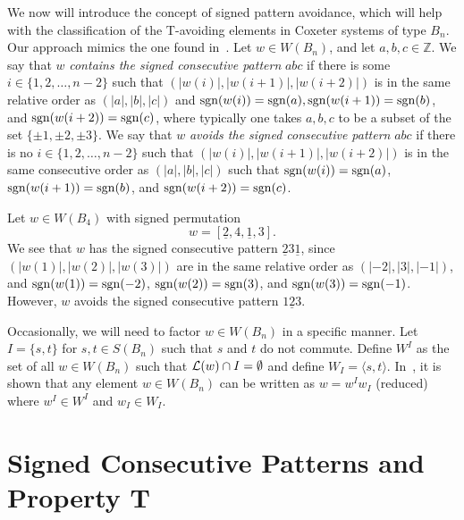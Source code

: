 We now will introduce the concept of signed pattern avoidance, which will help with the classification of the T-avoiding elements in Coxeter systems of type $B_n$. Our approach mimics the one found in~\cite{Gern2013a}. Let $w \in W(B_n)$, and let $a,b,c \in \mathbb{Z}$. We say that $w$ \emph{contains the signed consecutive pattern} $abc$ if there is some $i \in \{1,2, \ldots, n-2\}$ such that $(|w(i)|,|w(i+1)|,|w(i+2)|)$ is in the same relative order as $(|a|,|b|,|c|)$ and $\mathrm{sgn}(w(i))=\mathrm{sgn}(a), \mathrm{sgn}(w(i+1))=\mathrm{sgn}(b)$, and $\mathrm{sgn}(w(i+2))=\mathrm{sgn}(c)$, where typically one takes $a,b,c$ to be a subset of the set $\{\pm1,\pm2,\pm3\}$. We say that $w$ \emph{avoids the signed consecutive pattern} $abc$ if there is no $i \in \{1,2, \ldots, n-2\}$ such that $\left(|w(i)|, |w(i+1)|, |w(i+2)|\right)$ is in the same consecutive order as $\left(|a|, |b|, |c| \right)$ such that $\mathrm{sgn}(w(i))=\mathrm{sgn}(a)$, $\mathrm{sgn}(w(i+1))=\mathrm{sgn}(b)$, and $\mathrm{sgn}(w(i+2))=\mathrm{sgn}(c)$.

\begin{example}
Let $w \in W(B_4)$ with signed permutation \[w=[\underline{2},4, \underline{1}, 3].\] We see that $w$ has the signed consecutive pattern $\underline{2} 3 \underline{1}$, since $(|w(1)|, |w(2)|, |w(3)|)$ are in the same relative order as $(|-2|, |3|, |-1|)$, and $\mathrm{sgn}(w(1))=\mathrm{sgn}(-2)$, $\mathrm{sgn}(w(2))=\mathrm{sgn}(3)$, and $\mathrm{sgn}(w(3))=\mathrm{sgn}(-1)$. However, $w$ avoids the signed consecutive pattern $1\underline{2}3$.
\end{example}

Occasionally, we will need to factor $w \in W(B_n)$ in a specific manner. Let $I=\{s,t\}$ for $s, t \in S(B_n)$ such that $s$ and $t$ do not commute. Define $W^I$ as the set of all $w \in W(B_n)$ such that $\mathcal{L}(w) \cap I= \emptyset$ and define $W_I=\langle s,t \rangle$. In~\cite{Humphreys1990}, it is shown that any element $w \in W(B_n)$ can be written as $w=w^Iw_I$ (reduced) where $w^I \in W^I$ and $w_I \in W_I$.

\section{Signed Consecutive Patterns and Property T}\label{sec:TAB}



